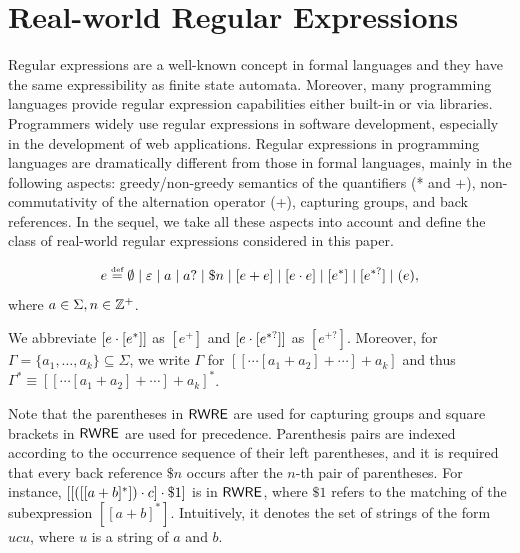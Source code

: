 
\section{Real-world Regular Expressions}
Regular expressions are a well-known concept in formal languages and they have the same expressibility as finite state automata. Moreover, many programming languages provide regular expression capabilities either built-in or via libraries. Programmers widely use regular expressions in software development, especially in the development of web applications. Regular expressions in programming languages are dramatically different from those in formal languages, mainly in the following aspects: greedy/non-greedy semantics of the quantifiers (* and +), non-commutativity of the alternation operator (+), capturing groups, and back references. In the sequel, we take all these aspects into account and define the class of real-world regular expressions considered in this paper. 
  
\begin{definition}
  	\[e \eqdef \emptyset \mid \varepsilon \mid a \mid a? \mid \$n \mid [e + e] \mid [e \concat e] \mid [e^*] \mid [e^{*?}] \mid (e), \]
  	where $a \in \Sigma, n \in \mathbb{Z}^+$. 
\end{definition}
We abbreviate $[e \cdot [e^*]]$ as $[e^+]$ and $[e \cdot [e^{*?}]]$ as $[e^{+?}]$. Moreover, for $\Gamma = \{a_1, \ldots, a_k\}\subseteq \Sigma$, we write $\Gamma$ for  $[[\cdots [a_1 + a_2] + \cdots] + a_k]$ and thus $\Gamma^\ast \equiv [[\cdots [a_1 + a_2] + \cdots] + a_k]^\ast$. 

Note that the parentheses in ${\sf RWRE}$ are used for capturing groups and square brackets in ${\sf RWRE}$ are used for precedence. 
%
Parenthesis pairs are indexed according to the occurrence sequence of their left parentheses, and it is required that every back reference $\$ n$ occurs  %
after the $n$-th pair of parentheses. For instance, $[[([[a+b]^*]) \cdot c] \cdot \$1]$ is in ${\sf RWRE}$, where $\$1$ refers to the matching of the subexpression $[[a+b]^*]$. Intuitively, it denotes the set of strings of the form $u c u$, where $u$ is a string of $a$ and $b$. 
  
